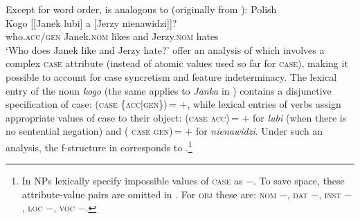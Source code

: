 \documentclass[output=paper]{../langscibook}
\begin{document}
Except for word order,  is
analogous to  (originally from
\citet{Dyla1984}):
\ea\label{ex:DKS:Indeterminacy:10}
    Polish\\\gll
      Kogo [[Janek lubi] a [Jerzy nienawidzi]]? \\
      who.\textsc{acc/gen} \phtm{[[}Janek.\textsc{nom} likes and \phtm{[}Jerzy.\textsc{nom} hates\\
\glt`Who does Janek like and Jerzy hate?' \hfill\citep[(10)]{DKS:Indeterminacy}
\z
\citet{DKS:Indeterminacy} offer an analysis of
 which involves a complex \textsc{case}
attribute (instead of atomic values used so far for \textsc{case}), making it possible to account for case syncretism and
feature indeterminacy. The lexical entry of the noun \emph{kogo} (the
same applies to \emph{Janka} in ) contains a disjunctive specification of
case: \textsc{(\UP case \{acc|gen\})\,= $+$}, while lexical
entries of verbs assign appropriate values of case to their object:
\textsc{(\UP\OBJ case acc)\,= $+$} for \emph{lubi} (when
there is no sentential negation) and \textsc{(\UP\OBJ
  case gen)\,= $+$} for \emph{nienawidzi}.
%
Under such an analysis, the f-structure in
 corresponds to
.\footnote{In \citet{DKS:Indeterminacy} NPs
  lexically specify impossible values of \textsc{case} as
  \textsc{$-$}. To save space, these attribute-value pairs are omitted in
  . For \textsc{obj} these are: \textsc{nom $-$},
\textsc{dat $-$}, \textsc{inst $-$}, \textsc{loc $-$}, \textsc{voc $-$}.}
\end{document}
